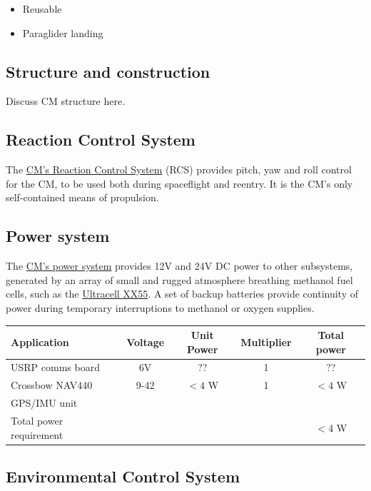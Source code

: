 \documentclass{report}
\begin{document}
\begin{itemize}
\item Reusable
\item Paraglider landing
\end{itemize}

\subsection{Structure and construction}

Discuss CM structure here.

\subsection{Reaction Control System}

The \href{http://cstart.org/wiki/CLLARE_CM_Reaction_Control_System}{CM's Reaction Control System} (RCS) provides pitch, yaw and roll control for the CM, to be used both during spaceflight and reentry. It is the CM's only self-contained means of propulsion.

\subsection{Power system}

The \href{http://cstart.org/wiki/CLLARE_CM_Power_System}{CM's power system} provides 12V and 24V DC power to other subsystems, generated by an array of small and rugged atmosphere breathing methanol fuel cells, such as the \href{http://www.ultracellpower.com/assets/XX55_Data_Sheet_01-27-2009.pdf}{Ultracell XX55}.  A set of backup batteries provide continuity of power during temporary interruptions to methanol or oxygen supplies.

\begin{tabular}{ | l | c | c | c | c | }
\hline
Application & Voltage & Unit Power & Multiplier & Total power \\
\hline
\hline
USRP comms board & 6V & ?? & 1 & ?? \\
\hline
Crossbow NAV440 & 9-42 & $<4$ W & 1 & $<4$ W \\
GPS/IMU unit & & & & \\
\hline
\hline
Total power requirement & & & & $<4$ W \\
\hline
\end{tabular}

\subsection{Environmental Control System}
\end{document}

